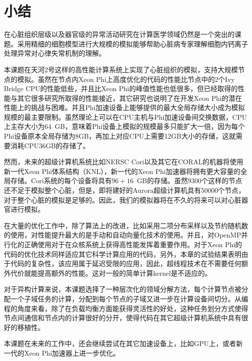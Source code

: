 \section{小结}
在心脏组织层级以及器官级的异常活动研究在计算医学领域仍然是一个突出的课题。采用精细的细胞模型进行大规模的模拟能够帮助心脏病专家理解细胞内钙离子处理异常对心律失常机制的理解。

本课题在天河2号这样的高性能计算系统上实现了心脏组织的模拟，支持大规模节点的模拟。虽然在节点内Xeon Phi上高度优化的代码的性能比节点中的2个Ivy Bridge CPU的性能低些，并且比Xeon Phi的峰值性能也低很多，但已经取得的性能与其它很多研究所取得的性能接近，其它研究也说明了在开发Xeon Phi的潜在性能上的挑战与困难。并且Phi加速设备上能够提供的最大全局存储大小成为模拟规模的最主要限制。虽然理论上可以在CPU主机与Phi加速设备间交换数据，CPU上主存大小为$64$~GB，意味着Phi设备上模拟的规模最多只能扩大一倍，因为每个Phi设备原本全局存储为8GB，再加上对应CPU上需要12GB大小的存储，这就需要消耗CPU36GB的存储了。

然而，未来的超级计算机系统比如NERSC Cori以及其它在CORAL的机器将使用新一代Xeon Phi体系结构（KNL），新一代的Xeon Phi加速器将拥有更大容量的全局存储。Cori系统的每个设备将具有$96+16$~GB的存储。虽然9300个这样的节点还不足于模拟整个心脏，但是，即将建好的Aurora超级计算机具有50000个节点，对于整个心脏的模拟是足够的。因此，我们的模拟器将在不久的将来可以对心脏器官进行模拟。

在大量的优化工作中，除了算法上的改进，比如采用二项分布采样以及节约随机数的使用，对性能提升最大的是手动和自动向量化技术的使用。并且，对OpenMP并行化的正确使用对于在众核系统上获得高性能发挥着重要作用。对于Xeon Phi的代码的优化技术同样适应其它科学计算应用的代码，另外，本章的试验结果表明由于代码的复杂性，该应用属于延迟受限的应用，因此，超线程技术在不需要任何额外代价就能提高额外的性能。这对一般的简单计算kernel是不适应的。

对于异构计算来说，本课题选择了一种层次化的领域分解方法，每个计算节点被分配一个子域任务的计算，分配到每个节点的子域又进一步在计算设备间切分。从编程的角度来看，除了在负载均衡方面能获得灵活性的好处，这种任务划分方式使得节点间通信和节点内的计算很好的分开，使得代码在其它超级计算机系统中具有很好的移植性。

本课题在未来的工作中，还会继续尝试在其它加速设备上，比如GPU上，或者新一代的Xeon Phi加速器上进一步优化。